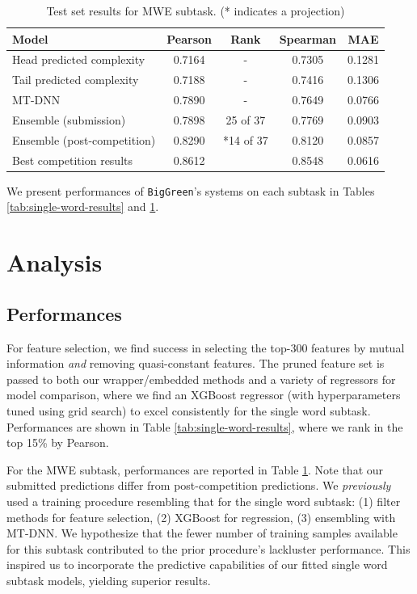 \documentclass{dcthesis}
\theoremstyle{definition}
\theoremstyle{remark}
\begin{document}
\begin{table}[t]
  \centering
  \begin{tabular}{lcccc}
  \hline \textbf{Model} & \textbf{Pearson} & \textbf{Rank} & \textbf{Spearman} & \textbf{MAE} \\ \hline
  Head predicted complexity & 0.7164 & - & 0.7305 & 0.1281 \\
  Tail predicted complexity & 0.7188 & - & 0.7416 & 0.1306 \\
  MT-DNN & 0.7890 & - & 0.7649 & 0.0766 \\
  Ensemble (submission) & 0.7898 & 25 of 37 & 0.7769 & 0.0903 \\
  Ensemble (post-competition) & 0.8290 & *14 of 37 & 0.8120 & 0.0857 \\
  \hline
  Best competition results & 0.8612 & &  0.8548 & 0.0616 \\ 
  \hline
  \end{tabular}
  \caption{\label{tab:multi-word-results} Test set results for MWE subtask. (* indicates a projection)}
\end{table}

We present performances of \texttt{BigGreen}'s systems on each subtask in Tables \ref{tab:single-word-results} and \ref{tab:multi-word-results}.

\chapter{Analysis}

\section{Performances}

For feature selection, we find success in selecting the top-300 features by mutual information \textit{and} removing quasi-constant features. The pruned feature set is passed to both our wrapper/embedded methods and a variety of regressors for model comparison, where we find an XGBoost regressor \citep{DBLP:journals/corr/ChenG16} (with hyperparameters tuned using grid search) to excel consistently for the single word subtask. Performances are shown in Table \ref{tab:single-word-results}, where we rank in the top 15\% by Pearson. 

For the MWE subtask, performances are reported in Table \ref{tab:multi-word-results}. Note that our submitted predictions differ from post-competition predictions. We \textit{previously} used a training procedure resembling that for the single word subtask: (1) filter methods for feature selection, (2) XGBoost for regression, (3) ensembling with MT-DNN. We hypothesize that the fewer number of training samples available for this subtask contributed to the prior procedure's lackluster performance. This inspired us to incorporate the predictive capabilities of our fitted single word subtask models, yielding superior results.
\end{document}
